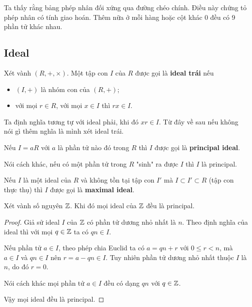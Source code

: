 Ta thấy rằng bảng phép nhân đối xứng qua đường chéo chính. Điều này chứng tỏ phép nhân có tính giao hoán. Thêm nữa ở mỗi hàng hoặc cột khác 0 đều có 9 phần tử khác nhau.

\subsection*{Ideal}

\begin{definition}[Ideal]
    Xét vành $(R, +, \times)$. Một tập con $I$ của $R$ được gọi là \textbf{ideal trái} nếu
    \begin{itemize}
        \item $(I, +)$ là nhóm con của $(R, +)$;
        \item với mọi $r \in R$, với mọi $x \in I$ thì $rx \in I$.
    \end{itemize}
\end{definition}

Ta định nghĩa tương tự với ideal phải, khi đó $xr \in I$. Từ đây về sau nếu không nói gì thêm nghĩa là mình xét ideal trái.

\begin{definition}
    Nếu $I = aR$ với $a$ là phần tử nào đó trong $R$ thì $I$ được gọi là \textbf{principal ideal}.
\end{definition}

Nói cách khác, nếu có một phần tử trong $R$ "sinh" ra được $I$ thì $I$ là principal.

\begin{definition}
    Nếu $I$ là một ideal của $R$ và không tồn tại tập con $I'$ mà $I \subset I' \subset R$ (tập con thực thụ) thì $I$ được gọi là \textbf{maximal ideal}.
\end{definition}

\begin{corollary}
    Xét vành số nguyên $\mathbb{Z}$. Khi đó mọi ideal của $\mathbb{Z}$ đều là principal.
\end{corollary}

\begin{proof}
    Giả sử ideal $I$ của $\mathbb{Z}$ có phần tử dương nhỏ nhất là $n$.
    Theo định nghĩa của ideal thì với mọi $q \in \mathbb{Z}$ ta có 
    $qn \in I$.

    Nếu phần tử $a \in I$, theo phép chia Euclid ta có $a = qn + r$
    với $0 \leq r < n$, mà $a \in I$ và $qn \in I$ nên $r = a - qn \in I$.
    Tuy nhiên phần tử dương nhỏ nhất thuộc $I$ là $n$, do đó $r = 0$.

    Nói cách khác mọi phần tử $a \in I$ đều có dạng $qn$ với $q \in \mathbb{Z}$.

    Vậy mọi ideal đều là principal.
\end{proof}

